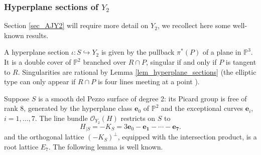 \documentclass[11pt]{amsart}
\theoremstyle{definition}
\newcommand{\pr}[1]{\mathbb P^{#1}}
\newcommand{\sO}{\mathcal{O}}
\DeclarePairedDelimiter{\abs}{\lvert}{\rvert}
\renewcommand{\P}{\mathbb{P}}
\begin{document}
\subsubsection*{Hyperplane sections of $Y_2$}
Section \ref{sec_AJY2} will require more detail on $Y_2$, we recollect here some well-known results.

A hyperplane section $\iota \colon S \hookrightarrow Y_2$ is given by the pullback $\pi^*(P)$ of a plane in $\P^3$. It is a double cover of $\pr 2$ branched over $R\cap P$, singular if and only if $P$ is tangent to $R$. Singularities are rational by Lemma \ref{lem_hyperplane_sections} (the elliptic type can only appear if $R\cap P$ is four lines meeting at a point \cite[Proposition~4.6]{hidaka1981}). 

Suppose $S$ is a smooth del Pezzo surface of degree 2: its Picard group is free of rank 8, generated by the hyperplane class $\mathbf{e}_0$ of $\pr 2$ and the exceptional curves $\mathbf{e}_i$, $i=1,\ldots,7$. The line bundle $\sO_{Y_2}(H)$ restricts on $S$ to 
\[ H_{|S}=-K_S =  3\mathbf{e}_0 - \mathbf{e_1}-\cdots-\mathbf{e_7}.\]
and the orthogonal lattice $(-K_S)^\perp$, equipped with the intersection product, is a root lattice $E_7$. The following lemma is well known.
\end{document}
